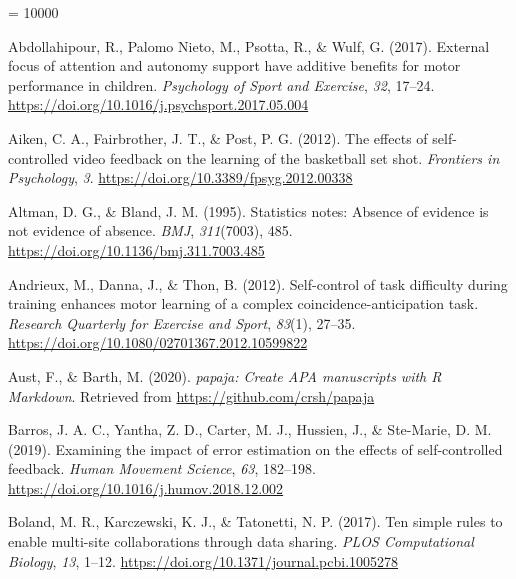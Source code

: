 \documentclass[
  english,
  doc, donotrepeattitle,floatsintext]{apa7}
\newlength{\cslhangindent}
\newlength{\cslentryspacingunit} %
\newenvironment{CSLReferences}[2] %
 {%
  \setlength{\parindent}{0pt}
  \ifodd #1
  \let\oldpar\par
  \def\par{\hangindent=\cslhangindent\oldpar}
  \fi
  \setlength{\parskip}{#2\cslentryspacingunit}
 }%
 {}
\begin{document}
\begingroup
\interlinepenalty = 10000
\setlength{\parindent}{-0.5in}
\setlength{\leftskip}{0.5in}

\endgroup

\hypertarget{refs}{}
\begin{CSLReferences}{1}{0}
\leavevmode{}%
Abdollahipour, R., Palomo Nieto, M., Psotta, R., \& Wulf, G. (2017). External focus of attention and autonomy support have additive benefits for motor performance in children. \emph{Psychology of Sport and Exercise}, \emph{32}, 17--24. \url{https://doi.org/10.1016/j.psychsport.2017.05.004}

\leavevmode{}%
Aiken, C. A., Fairbrother, J. T., \& Post, P. G. (2012). The effects of self-controlled video feedback on the learning of the basketball set shot. \emph{Frontiers in Psychology}, \emph{3}. \url{https://doi.org/10.3389/fpsyg.2012.00338}

\leavevmode{}%
Altman, D. G., \& Bland, J. M. (1995). Statistics notes: Absence of evidence is not evidence of absence. \emph{BMJ}, \emph{311}(7003), 485. \url{https://doi.org/10.1136/bmj.311.7003.485}

\leavevmode{}%
Andrieux, M., Danna, J., \& Thon, B. (2012). Self-control of task difficulty during training enhances motor learning of a complex coincidence-anticipation task. \emph{Research Quarterly for Exercise and Sport}, \emph{83}(1), 27--35. \url{https://doi.org/10.1080/02701367.2012.10599822}

\leavevmode{}%
Aust, F., \& Barth, M. (2020). \emph{{papaja}: {Create} {APA} manuscripts with {R Markdown}}. Retrieved from \url{https://github.com/crsh/papaja}

\leavevmode{}%
Barros, J. A. C., Yantha, Z. D., Carter, M. J., Hussien, J., \& Ste-Marie, D. M. (2019). Examining the impact of error estimation on the effects of self-controlled feedback. \emph{Human Movement Science}, \emph{63}, 182--198. \url{https://doi.org/10.1016/j.humov.2018.12.002}

\leavevmode{}%
Boland, M. R., Karczewski, K. J., \& Tatonetti, N. P. (2017). Ten simple rules to enable multi-site collaborations through data sharing. \emph{PLOS Computational Biology}, \emph{13}, 1--12. \url{https://doi.org/10.1371/journal.pcbi.1005278}


\end{CSLReferences}
\end{document}
